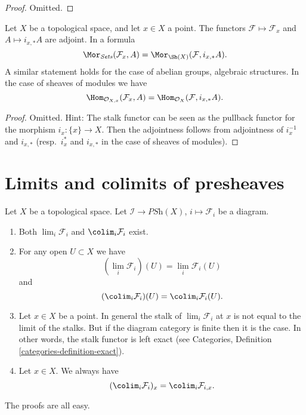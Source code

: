 \begin{proof}
Omitted.
\end{proof}

\begin{lemma}
\label{lemma-stalk-skyscraper-adjoint}
Let $X$ be a topological space, and let $x \in X$ a point.
The functors $\mathcal{F} \mapsto \mathcal{F}_x$ and
$A \mapsto i_{x, *}A$ are adjoint. In a formula
$$
\Mor_{\textit{Sets}}(\mathcal{F}_x, A)
=
\Mor_{\Sh(X)}(\mathcal{F}, i_{x, *}A).
$$
A similar statement holds for the case of
abelian groups, algebraic structures. In the case of
sheaves of modules we have
$$
\Hom_{\mathcal{O}_{X, x}}(\mathcal{F}_x, A)
=
\Hom_{\mathcal{O}_X}(\mathcal{F}, i_{x, *}A).
$$
\end{lemma}

\begin{proof}
Omitted. Hint: The stalk functor can be
seen as the pullback functor for the morphism $i_x : \{x\} \to X$.
Then the adjointness follows from adjointness of
$i_x^{-1}$ and $i_{x, *}$ (resp.\ $i_x^*$ and $i_{x, *}$
in the case of sheaves of modules).
\end{proof}









\section{Limits and colimits of presheaves}
\label{section-limits-presheaves}

\noindent
Let $X$ be a topological space.
Let $\mathcal{I} \to \textit{PSh}(X)$, $i \mapsto \mathcal{F}_i$
be a diagram.
\begin{enumerate}
\item Both $\lim_i \mathcal{F}_i$ and $\colim_i \mathcal{F}_i$
exist.
\item For any open $U \subset X$ we have
$$
(\lim_i \mathcal{F}_i)(U) =
\lim_i \mathcal{F}_i(U)
$$
and
$$
(\colim_i \mathcal{F}_i)(U) =
\colim_i \mathcal{F}_i(U).
$$
\item Let $x \in X$ be a point. In general the stalk of
$\lim_i \mathcal{F}_i$ at $x$ is not equal to
the limit of the stalks. But if the diagram category is finite
then it is the case. In other words, the stalk functor is
left exact (see Categories, Definition \ref{categories-definition-exact}).
\item Let $x \in X$. We always have
$$
(\colim_i \mathcal{F}_i)_x =
\colim_i \mathcal{F}_{i, x}.
$$
\end{enumerate}
The proofs are all easy.

